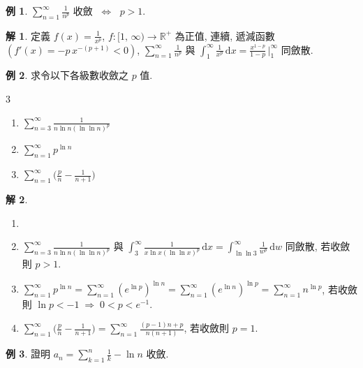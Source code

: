 \documentclass[12pt]{extarticle}
\newcommand{\ds}{\displaystyle}
\newcommand{\ie}{\;\Longrightarrow\;}
\newcommand{\ifff}{\;\Longleftrightarrow\;}
\theoremstyle{definition}
\newtheorem*{ex}{例}
\newtheorem*{sol}{解}
\newcommand{\myline}{\noindent\makebox[\linewidth]{\rule{\paperwidth}{0.4pt}}}
\begin{document}
\begin{ex}
  $\ds\sum_{n = 1}^\infty\frac{1}{n^p}$ 收斂 $\ifff$ $p > 1$. 
\end{ex}

\begin{sol}
  定義 $\ds f(x) = \frac{1}{x^p}$, $\ds f:[1,\,\infty)\to\mathbb{R}^+$ 為正值, 連續, 遞減函數 $\ds(f'(x) = -p\,x^{-(p + 1)} < 0)$, $\ds\sum_{n = 1}^\infty\frac{1}{n^p}$ 與 $\ds\int_1^\infty\frac{1}{x^p}\,\text{d}x = \frac{x^{1 - p}}{1 - p}\,\bigg|_1^\infty$ 同斂散. 
\end{sol}

\begin{ex} 求令以下各級數收斂之 $p$ 值. 
  \begin{multicols}{3}
    \begin{enumerate}\setlength{\itemsep}{0pt}
      \item $\ds\sum_{n = 3}^\infty\frac{1}{n\ln n(\ln\ln n)^p}$
      \item $\ds\sum_{n = 1}^\infty p^{\ln n}$
      \item $\ds\sum_{n = 1}^\infty\Big(\frac{p}{n} - \frac{1}{n + 1}\Big)$
    \end{enumerate}
  \end{multicols}
\end{ex}

\begin{sol}
  \begin{enumerate}\setlength{\itemsep}{0pt}
    \item[]
    \item $\ds\sum_{n = 3}^\infty\frac{1}{n\ln n(\ln\ln n)^p}$ 與 $\ds\int_{3}^\infty\frac{1}{x\ln x(\ln\ln x)^p}\,\text{d}x = \int_{\ln\ln 3}^\infty\frac{1}{w^p}\,\text{d}w$ 同斂散, 若收斂則 $p > 1$. 
    \item $\ds\sum_{n = 1}^\infty p^{\ln n} = \sum_{n = 1}^\infty (e^{\ln p})^{\ln n} = \sum_{n = 1}^\infty (e^{\ln n})^{\ln p} = \sum_{n = 1}^\infty n^{\ln p}$, 若收斂則 $\ln p < -1 \ie 0 < p < e^{-1}$. 
    \item $\ds\sum_{n = 1}^\infty\Big(\frac{p}{n} - \frac{1}{n + 1}\Big) = \sum_{n = 1}^\infty\frac{(p - 1) n + p}{n(n + 1)}$, 若收斂則 $p = 1$. 
  \end{enumerate}
\end{sol}

\myline

\begin{ex}
  證明 $\ds a_n = \sum_{k = 1}^n\frac{1}{k} - \ln n$ 收斂. 
\end{ex}
\end{document}

